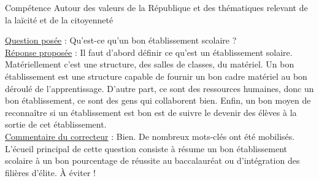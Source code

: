 \begin{reportBlock}{Compétence \og Autour des valeurs de la République et des thématiques relevant de la laïcité et de la citoyenneté \fg{}}

\underline{Question posée} : Qu'est-ce qu'un bon établissement scolaire ? \\

\underline{Réponse proposée} : Il faut d'abord définir ce qu'est un établissement solaire. Matériellement c'est une structure, des salles de classes, du matériel. Un bon établissement est une structure capable de fournir un bon cadre matériel au bon déroulé de l'apprentissage. D'autre part, ce sont des ressources humaines, donc un bon établissement, ce sont des gens qui collaborent bien. Enfin, un bon moyen de reconnaître si un établissement est bon est de suivre le devenir des élèves à la sortie de cet établissement. \\

\underline{Commentaire du correcteur} : Bien. De nombreux mots-clés ont été mobilisés. L'écueil principal de cette question consiste à résume un bon établissement scolaire à un bon pourcentage de réussite au baccalauréat ou d'intégration des filières d'élite. À éviter ! 

\end{reportBlock}



